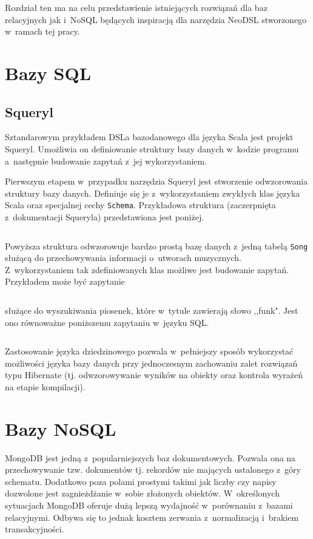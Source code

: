 \documentclass{xmgr}
\begin{document}
Rozdział ten ma na celu przedstawienie istniejących rozwiązań dla baz relacyjnych jak i~NoSQL będących inspiracją dla narzędzia NeoDSL stworzonego w~ramach tej pracy.

\newpage

\section{Bazy SQL}

\subsection{Squeryl}

Sztandarowym przykładem DSLa bazodanowego dla języka Scala jest projekt Squeryl. Umożliwia on definiowanie struktury bazy danych w~kodzie programu a~następnie budowanie zapytań z~jej wykorzystaniem.

Pierwszym etapem w~przypadku narzędzia Squeryl jest stworzenie odwzorowania struktury bazy danych. Definiuje się je z~wykorzystaniem zwykłych klas języka Scala oraz specjalnej cechy \texttt{Schema}. Przykładowa struktura (zaczerpnięta z~dokumentacji Squeryla\cite{squeryl_schemadefinition}) przedstawiona jest poniżej.

\inputminted{scala}{listings/scala/squeryl-schema.scala}

Powyższa struktura odwzorowuje bardzo prostą bazę danych z~jedną tabelą \texttt{Song} służącą do przechowywania informacji o~utworach muzycznych. Z~wykorzystaniem tak zdefiniowanych klas możliwe jest budowanie zapytań. Przykładem może być zapytanie

\inputminted{scala}{listings/scala/squeryl-query.scala}

\noindent służące do wyszukiwania piosenek, które w~tytule zawierają słowo ,,funk". Jest ono równoważne poniższemu zapytaniu w~języku SQL.

\inputminted{sql}{listings/sql/squeryl-query.sql}

Zastosowanie języka dziedzinowego pozwala w~pełniejszy sposób wykorzystać możliwości języka bazy danych przy jednoczesnym zachowaniu zalet rozwiązań typu Hibernate (tj. odwzorowywanie wyników na obiekty oraz kontrola wyrażeń na etapie kompilacji).

\section{Bazy NoSQL}

MongoDB jest jedną z~popularniejszych baz dokumentowych. Pozwala ona na przechowywanie tzw. dokumentów tj. rekordów nie mających ustalonego z~góry schematu. Dodatkowo poza polami prostymi takimi jak liczby czy napisy dozwolone jest zagnieżdżanie w~sobie złożonych obiektów. W~określonych sytuacjach MongoDB oferuje dużą lepszą wydajność w~porównaniu z~bazami relacyjnymi. Odbywa się to jednak kosztem zerwania z~normalizacją i~brakiem transakcyjności.
\end{document}

